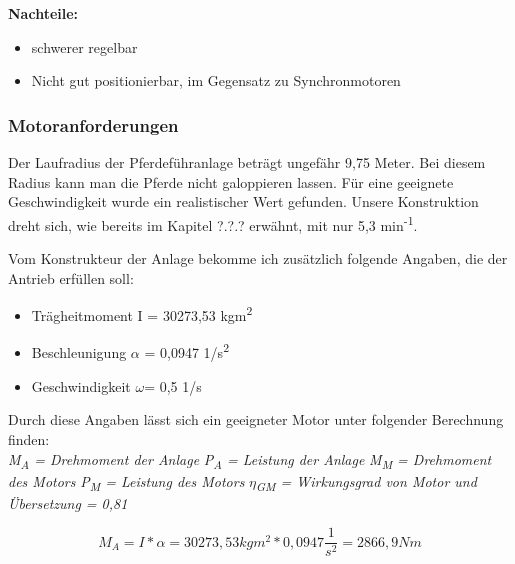 \textbf{Nachteile:}

\begin{itemize}
	\item{schwerer regelbar}
	\item{Nicht gut positionierbar, im Gegensatz zu Synchronmotoren}
\end{itemize}

\subsubsection{Motoranforderungen}
\label{sec:motoranforderungen}

Der Laufradius der Pferdeführanlage beträgt ungefähr 9,75 Meter. Bei diesem Radius kann man die Pferde nicht galoppieren lassen. 
Für eine geeignete Geschwindigkeit wurde ein realistischer Wert gefunden. %
Unsere Konstruktion dreht sich, wie bereits im Kapitel ?.?.? erwähnt, mit nur 5,3 min\textsuperscript{-1}. 

Vom Konstrukteur der Anlage bekomme ich zusätzlich folgende Angaben, die der Antrieb erfüllen soll:
\\

\begin{itemize}
	\item{Trägheitmoment I = 30273,53 kgm\textsuperscript{2}}
	\item{Beschleunigung $\alpha$ = 0,0947 1/s\textsuperscript{2}}
	\item{Geschwindigkeit $\omega$= 0,5 1/s}
\end{itemize}

Durch diese Angaben lässt sich ein geeigneter Motor unter folgender Berechnung finden:
\\
\textit{M\textsubscript{A} = Drehmoment der Anlage} \newline
\textit{P\textsubscript{A} = Leistung der Anlage} \newline
\textit{M\textsubscript{M} = Drehmoment des Motors} \newline
\textit{P\textsubscript{M} = Leistung des Motors} \newline
\textit{$\eta$\textsubscript{GM} = Wirkungsgrad von Motor und Übersetzung = 0,81}


\begin{center}
\begin{equation}
  \label{eq:2}
	M_{A} = I * \alpha = 30273,53kgm^2 * 0,0947 \dfrac{1}{s^2} = 2866,9 Nm
\end{equation} 
\end{center}


